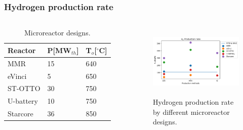 \begin{frame}
\frametitle{Hydrogen production rate}
\begin{columns}
    \column[t]{4.5cm}
	\begin{table}[!htb]
		\centering
	    \caption{Microreactor designs.}
		\begin{tabular}{l|ll}
		\hline
		Reactor      & P[MW$_{th}$] & T$_o$[$^\circ$C]\\ \hline
		MMR          & 15         & 640             \\
		eVinci       & 5          & 650             \\
		ST-OTTO      & 30         & 750             \\
		U-battery    & 10         & 750             \\
		Starcore     & 36         & 850             \\ \hline
        \end{tabular}
	\end{table}

	\column[t]{5.5cm}
	\begin{figure}[htbp!]
		\begin{center}
			\includegraphics[height=3.5cm]{images/reactors-by-hour1}
		\end{center}
		\caption{Hydrogen production rate by different microreactor designs.}
	\end{figure}

\end{columns}
\end{frame}

